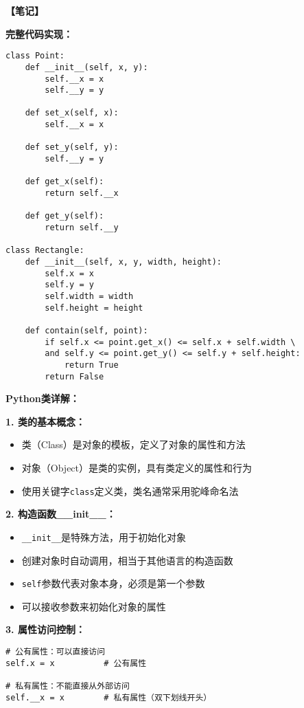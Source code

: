 \begin{mdframed}
  \textbf{\color{red}【笔记】}

  \textbf{完整代码实现：}
  \begin{lstlisting}
class Point:
    def __init__(self, x, y):
        self.__x = x
        self.__y = y

    def set_x(self, x):
        self.__x = x

    def set_y(self, y):
        self.__y = y

    def get_x(self):
        return self.__x

    def get_y(self):
        return self.__y

class Rectangle:
    def __init__(self, x, y, width, height):
        self.x = x
        self.y = y
        self.width = width
        self.height = height

    def contain(self, point):
        if self.x <= point.get_x() <= self.x + self.width \
        and self.y <= point.get_y() <= self.y + self.height:
            return True
        return False
  \end{lstlisting}

  \textbf{Python类详解：}

  \textbf{1. 类的基本概念：}
  \begin{itemize}
    \item 类（Class）是对象的模板，定义了对象的属性和方法
    \item 对象（Object）是类的实例，具有类定义的属性和行为
    \item 使用关键字\texttt{class}定义类，类名通常采用驼峰命名法
  \end{itemize}

  \textbf{2. 构造函数\_\_init\_\_：}
  \begin{itemize}
    \item \texttt{\_\_init\_\_}是特殊方法，用于初始化对象
    \item 创建对象时自动调用，相当于其他语言的构造函数
    \item \texttt{self}参数代表对象本身，必须是第一个参数
    \item 可以接收参数来初始化对象的属性
  \end{itemize}

  \textbf{3. 属性访问控制：}
  \begin{lstlisting}
# 公有属性：可以直接访问
self.x = x          # 公有属性

# 私有属性：不能直接从外部访问
self.__x = x        # 私有属性（双下划线开头）


\end{lstlisting}
\end{mdframed}
